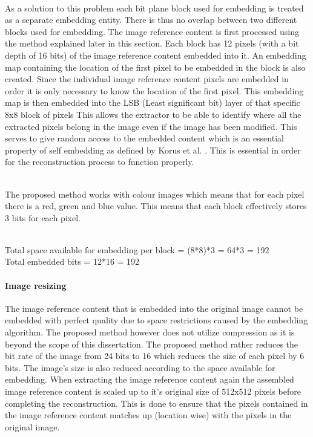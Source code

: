 \documentclass[12pt]{article}
\begin{document}
\hspace{0pt} \\
As a solution to this problem each bit plane block used for embedding is treated as a separate embedding entity.
There is thus no overlap between two different blocks used for embedding.
The image reference content is first processed using the method explained later in this section.
Each block has 12 pixels (with a bit depth of 16 bits) of the image reference content embedded into it.
An embedding map containing the location of the first pixel to be embedded in the block is also created.
Since the individual image reference content pixels are embedded in order it is only necessary to know the location of the first pixel.
This embedding map is then embedded into the LSB (Least significant bit) layer of that specific 8x8 block of pixels 
This allows the extractor to be able to identify where all the extracted pixels belong in the image even if the image has been modified.
This serves to give random access to the embedded content which is an essential property of self embedding as defined by Korus et al. \cite{korus2013efficient}.
This is essential in order for the reconstruction process to function properly.

\hspace{0pt} \\
The proposed method works with colour images which means that for each pixel there is a red, green and blue value. This means that each block effectively stores 3 bits for each pixel.

\hspace{0pt} \\
Total space available for embedding per block = (8*8)*3 = 64*3 = 192
\hspace{0pt} \\
Total embedded bits = 12*16 = 192

\paragraph{Image resizing}
\label{ImageCompression}
The image reference content that is embedded into the original image cannot be embedded with perfect quality due to space restrictions caused by the embedding algorithm. 
The proposed method however does not utilize compression as it is beyond the scope of this dissertation.
The proposed method rather reduces the bit rate of the image from 24 bits to 16 which reduces the size of each pixel by 6 bits.
The image's size is also reduced according to the space available for embedding.
When extracting the image reference content again the assembled image reference content is scaled up to it's original size of 512x512 pixels before completing the reconstruction.
This is done to ensure that the pixels contained in the image reference content matches up (location wise) with the pixels in the original image.
\end{document}
